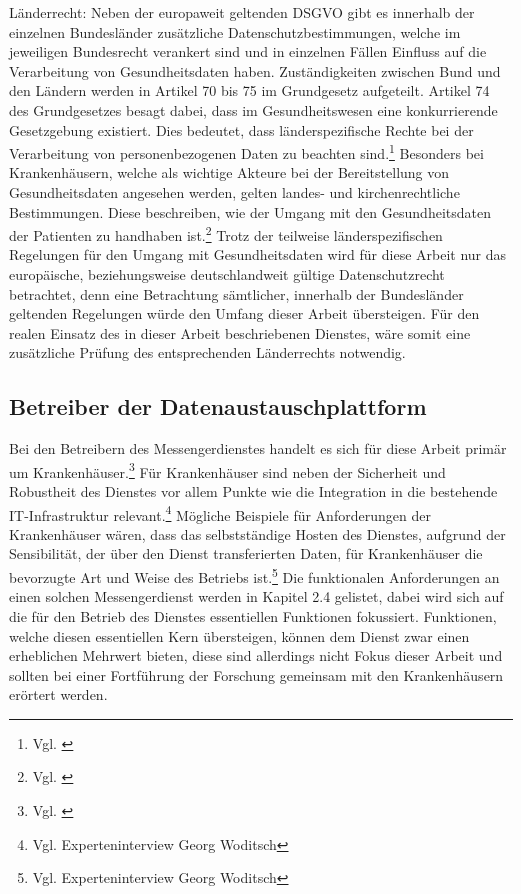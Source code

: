 Länderrecht: Neben der europaweit geltenden DSGVO gibt es innerhalb der einzelnen Bundesländer zusätzliche Datenschutzbestimmungen, welche im jeweiligen Bundesrecht verankert sind und in einzelnen Fällen Einfluss auf die Verarbeitung von Gesundheitsdaten haben.
Zuständigkeiten zwischen Bund und den Ländern werden in Artikel 70 bis 75 im Grundgesetz aufgeteilt. Artikel 74 des Grundgesetzes besagt dabei, dass im Gesundheitswesen eine konkurrierende Gesetzgebung existiert. Dies bedeutet, dass länderspezifische Rechte bei der Verarbeitung von personenbezogenen Daten zu beachten sind.\footnote{Vgl. \cite[S. 8 f.]{Bundesverband-Gesundheits-IT-e.V.2016}} Besonders bei Krankenhäusern, welche als wichtige Akteure bei der Bereitstellung von Gesundheitsdaten angesehen werden, gelten landes- und kirchenrechtliche Bestimmungen. Diese beschreiben, wie der Umgang mit den Gesundheitsdaten der Patienten zu handhaben ist.\footnote{Vgl. \cite[S. 21]{Bundesaerztekammer2020}}
Trotz der teilweise länderspezifischen Regelungen für den Umgang mit Gesundheitsdaten wird für diese Arbeit nur das europäische, beziehungsweise deutschlandweit gültige Datenschutzrecht betrachtet, denn eine Betrachtung sämtlicher, innerhalb der Bundesländer geltenden Regelungen würde den Umfang dieser Arbeit übersteigen. Für den realen Einsatz des in dieser Arbeit beschriebenen Dienstes, wäre somit eine zusätzliche Prüfung des entsprechenden Länderrechts notwendig.

\subsection{Betreiber der Datenaustauschplattform}\label{subsection:bdd}
Bei den Betreibern des Messengerdienstes handelt es sich für diese Arbeit primär um Krankenhäuser.\footnote{Vgl. \cite[S. 13]{Bundesverband-Gesundheits-IT-e.V.2016}} Für Krankenhäuser sind neben der Sicherheit und Robustheit des Dienstes vor allem Punkte wie die Integration in die bestehende IT-Infrastruktur relevant.\footnote{Vgl. Experteninterview Georg Woditsch}
Mögliche Beispiele für Anforderungen der Krankenhäuser wären, dass das selbstständige Hosten des Dienstes, aufgrund der Sensibilität, der über den Dienst transferierten Daten, für Krankenhäuser die bevorzugte Art und Weise des Betriebs ist.\footnote{Vgl. Experteninterview Georg Woditsch} Die funktionalen Anforderungen an einen solchen Messengerdienst werden in Kapitel 2.4 gelistet, dabei wird sich auf die für den Betrieb des Dienstes essentiellen Funktionen fokussiert. Funktionen, welche diesen essentiellen Kern übersteigen, können dem Dienst zwar einen erheblichen Mehrwert bieten, diese sind allerdings nicht Fokus dieser Arbeit und sollten bei einer Fortführung der Forschung gemeinsam mit den Krankenhäusern erörtert werden.

